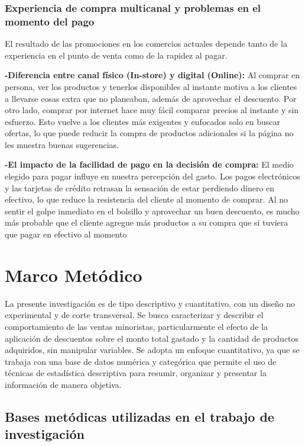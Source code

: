 \documentclass[oneside,11pt]{Latex/Classes/PhDthesisPSnPDF}
\begin{document}
\subsection{Experiencia de compra multicanal y problemas en el momento del pago}

El resultado de las promociones en los comercios actuales depende tanto
de la experiencia en el punto de venta como de la rapidez al pagar.

\textbf{-Diferencia entre canal físico (In-store) y digital (Online):}
Al comprar en persona, ver los productos y tenerlos disponibles al
instante motiva a los clientes a llevarse cosas extra que no planeaban,
además de aprovechar el descuento. Por otro lado, comprar por internet
hace muy fácil comparar precios al instante y sin esfuerzo. Esto vuelve
a los clientes más exigentes y enfocados solo en buscar ofertas, lo que
puede reducir la compra de productos adicionales si la página no les
muestra buenas sugerencias.

\textbf{-El impacto de la facilidad de pago en la decisión de compra:}
El medio elegido para pagar influye en nuestra percepción del gasto. Los
pagos electrónicos y las tarjetas de crédito retrasan la sensación de
estar perdiendo dinero en efectivo, lo que reduce la resistencia del
cliente al momento de comprar. Al no sentir el golpe inmediato en el
bolsillo y aprovechar un buen descuento, es mucho más probable que el
cliente agregue más productos a su compra que si tuviera que pagar en
efectivo al momento\\

\chapter{Marco Metódico}

La presente investigación es de tipo descriptivo y cuantitativo, con un
diseño no experimental y de corte transversal. Se busca caracterizar y
describir el comportamiento de las ventas minoristas, particularmente el
efecto de la aplicación de descuentos sobre el monto total gastado y la
cantidad de productos adquiridos, sin manipular variables. Se adopta un
enfoque cuantitativo, ya que se trabaja con una base de datos numérica y
categórica que permite el uso de técnicas de estadística descriptiva
para resumir, organizar y presentar la información de manera objetiva.

\section{Bases metódicas utilizadas en el trabajo de investigación}
\end{document}
